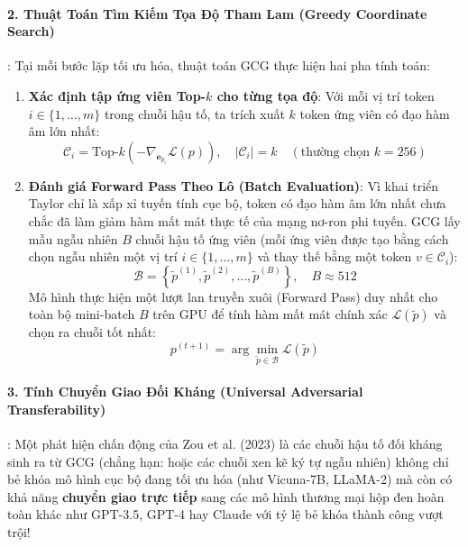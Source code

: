 \paragraph{2. Thuật Toán Tìm Kiếm Tọa Độ Tham Lam (Greedy Coordinate Search)}:
Tại mỗi bước lặp tối ưu hóa, thuật toán GCG thực hiện hai pha tính toán:
\begin{enumerate}
  \item \textbf{Xác định tập ứng viên Top-$k$ cho từng tọa độ}: Với mỗi vị trí token $i \in \{1, \dots, m\}$ trong chuỗi hậu tố, ta trích xuất $k$ token ứng viên có đạo hàm âm lớn nhất:
  \begin{equation}
  \mathcal{C}_i = \text{Top-}k \left( - \nabla_{\mathbf{e}_{p_i}} \mathcal{L}(p) \right), \quad |\mathcal{C}_i| = k \quad (\text{thường chọn } k = 256)
  \end{equation}
  \item \textbf{Đánh giá Forward Pass Theo Lô (Batch Evaluation)}: Vì khai triển Taylor chỉ là xấp xỉ tuyến tính cục bộ, token có đạo hàm âm lớn nhất chưa chắc đã làm giảm hàm mất mát thực tế của mạng nơ-ron phi tuyến. GCG lấy mẫu ngẫu nhiên $B$ chuỗi hậu tố ứng viên (mỗi ứng viên được tạo bằng cách chọn ngẫu nhiên một vị trí $i \in \{1, \dots, m\}$ và thay thế bằng một token $v \in \mathcal{C}_i$):
  \begin{equation}
  \mathcal{B} = \left\{ \tilde{p}^{(1)}, \tilde{p}^{(2)}, \dots, \tilde{p}^{(B)} \right\}, \quad B \approx 512
  \end{equation}
  Mô hình thực hiện một lượt lan truyền xuôi (Forward Pass) duy nhất cho toàn bộ mini-batch $B$ trên GPU để tính hàm mất mát chính xác $\mathcal{L}(\tilde{p})$ và chọn ra chuỗi tốt nhất:
  \begin{equation}
  p^{(t+1)} = \arg\min_{\tilde{p} \in \mathcal{B}} \mathcal{L}(\tilde{p})
  \end{equation}
\end{enumerate}

\paragraph{3. Tính Chuyển Giao Đối Kháng (Universal Adversarial Transferability)}:
Một phát hiện chấn động của Zou et al. (2023) là các chuỗi hậu tố đối kháng sinh ra từ GCG (chẳng hạn:  hoặc các chuỗi xen kẽ ký tự ngẫu nhiên) không chỉ bẻ khóa mô hình cục bộ đang tối ưu hóa (như Vicuna-7B, LLaMA-2) mà còn có khả năng \textbf{chuyển giao trực tiếp} sang các mô hình thương mại hộp đen hoàn toàn khác như GPT-3.5, GPT-4 hay Claude với tỷ lệ bẻ khóa thành công vượt trội!

